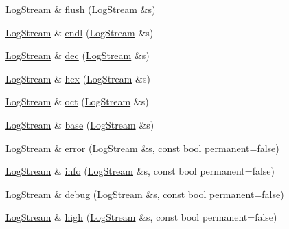\begin{DoxyCompactItemize}
\item 
\hyperlink{classkisscpp_1_1_log_stream}{Log\-Stream} \& \hyperlink{namespacekisscpp_1_1manip_a416806b7a937a2437ffadb9b523e1cf3}{flush} (\hyperlink{classkisscpp_1_1_log_stream}{Log\-Stream} \&s)
\item 
\hyperlink{classkisscpp_1_1_log_stream}{Log\-Stream} \& \hyperlink{namespacekisscpp_1_1manip_ad682f16cb474bc7ff2c991ad2c45db66}{endl} (\hyperlink{classkisscpp_1_1_log_stream}{Log\-Stream} \&s)
\item 
\hyperlink{classkisscpp_1_1_log_stream}{Log\-Stream} \& \hyperlink{namespacekisscpp_1_1manip_a5d7a175caf56eafe6f39469a0b0ac034}{dec} (\hyperlink{classkisscpp_1_1_log_stream}{Log\-Stream} \&s)
\item 
\hyperlink{classkisscpp_1_1_log_stream}{Log\-Stream} \& \hyperlink{namespacekisscpp_1_1manip_a1463e1f81c1a4a6c6e19e883f1160059}{hex} (\hyperlink{classkisscpp_1_1_log_stream}{Log\-Stream} \&s)
\item 
\hyperlink{classkisscpp_1_1_log_stream}{Log\-Stream} \& \hyperlink{namespacekisscpp_1_1manip_a1d9bd6b119890c9396e1dce048c07032}{oct} (\hyperlink{classkisscpp_1_1_log_stream}{Log\-Stream} \&s)
\item 
\hyperlink{classkisscpp_1_1_log_stream}{Log\-Stream} \& \hyperlink{namespacekisscpp_1_1manip_a3a365ff3909fcd0d76c2f7fa4da3b2b0}{base} (\hyperlink{classkisscpp_1_1_log_stream}{Log\-Stream} \&s)
\item 
\hyperlink{classkisscpp_1_1_log_stream}{Log\-Stream} \& \hyperlink{namespacekisscpp_1_1manip_a53df3ad3d908fa67b2d4a73000241b4f}{error} (\hyperlink{classkisscpp_1_1_log_stream}{Log\-Stream} \&s, const bool permanent=false)
\item 
\hyperlink{classkisscpp_1_1_log_stream}{Log\-Stream} \& \hyperlink{namespacekisscpp_1_1manip_aff72768a5e8b0486de0cecb0bd95f3e4}{info} (\hyperlink{classkisscpp_1_1_log_stream}{Log\-Stream} \&s, const bool permanent=false)
\item 
\hyperlink{classkisscpp_1_1_log_stream}{Log\-Stream} \& \hyperlink{namespacekisscpp_1_1manip_a795be5b59b6a02e1d8f6d9d5bb41c3a4}{debug} (\hyperlink{classkisscpp_1_1_log_stream}{Log\-Stream} \&s, const bool permanent=false)
\item 
\hyperlink{classkisscpp_1_1_log_stream}{Log\-Stream} \& \hyperlink{namespacekisscpp_1_1manip_a210331dfe6a9773c4e8e1db1e889820b}{high} (\hyperlink{classkisscpp_1_1_log_stream}{Log\-Stream} \&s, const bool permanent=false)
\item 

\end{DoxyCompactItemize}
